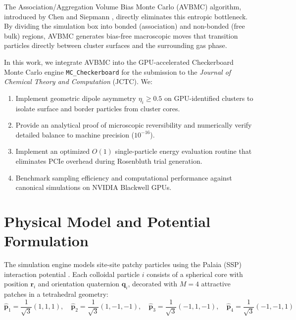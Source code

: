 \documentclass[11pt,a4paper]{article}
\begin{document}
The Association/Aggregation Volume Bias Monte Carlo (AVBMC) algorithm, introduced by Chen and Siepmann \cite{chen2000,chen2001}, directly eliminates this entropic bottleneck. By dividing the simulation box into bonded (association) and non-bonded (free bulk) regions, AVBMC generates bias-free macroscopic moves that transition particles directly between cluster surfaces and the surrounding gas phase.

In this work, we integrate AVBMC into the GPU-accelerated Checkerboard Monte Carlo engine \texttt{MC\_Checkerboard} for the submission to the \textit{Journal of Chemical Theory and Computation} (JCTC). We:
\begin{enumerate}
    \item Implement geometric dipole asymmetry $\eta_i \ge 0.5$ on GPU-identified clusters to isolate surface and border particles from cluster cores.
    \item Provide an analytical proof of microscopic reversibility and numerically verify detailed balance to machine precision ($10^{-16}$).
    \item Implement an optimized $O(1)$ single-particle energy evaluation routine that eliminates PCIe overhead during Rosenbluth trial generation.
    \item Benchmark sampling efficiency and computational performance against canonical simulations on NVIDIA Blackwell GPUs.
\end{enumerate}

\section{Physical Model and Potential Formulation}
The simulation engine models site-site patchy particles using the Palaia (SSP) interaction potential \cite{palaia2022}. Each colloidal particle $i$ consists of a spherical core with position $\mathbf{r}_i$ and orientation quaternion $\mathbf{q}_i$, decorated with $M = 4$ attractive patches in a tetrahedral geometry:
\begin{equation}
\hat{\mathbf{p}}_1 = \frac{1}{\sqrt{3}}(1, 1, 1), \quad
\hat{\mathbf{p}}_2 = \frac{1}{\sqrt{3}}(1, -1, -1), \quad
\hat{\mathbf{p}}_3 = \frac{1}{\sqrt{3}}(-1, 1, -1), \quad
\hat{\mathbf{p}}_4 = \frac{1}{\sqrt{3}}(-1, -1, 1)
\end{equation}
\end{document}
